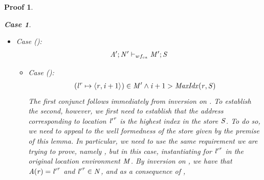 \documentclass[showabstract,showacknowledgments,showpreface,showdedication]{iuphd}
\newtheorem*{bcase}{Case}
\theoremstyle{nonumberplain}
\newtheorem{nproof}{Proof}
\begin{document}
\begin{nproof}
\begin{bcase}
\begin{itemize}
\begin{itemize}
\begin{align*}
      \end{align*}
      Of the requirements for this judgement, the only one that is
      not satisfied immediately by the well formedness of the store
      given in the premise of the lemma is requirement
      The specific requirement is to establish that
      \begin{align*}
      (\locreg{\loc'}{\reg} \mapsto \concreteloc{\reg}{\ind}{})  \in \MENV' \wedge \\
      (\locreg{\loc}{\reg} \mapsto \concreteloc{\reg}{\ind + 1}{})  \in \MENV',
      \end{align*}
      which follows immediately by inversion on \dletloctag{}.
      \item Case ():
      \begin{align*}
      \mathit{A}';\mathit{N}' \vdash_{wf_{ca}} \mathit{M}';\mathit{S}
      \end{align*}
        \begin{itemize}
        \item Case ():
        \begin{align*}
                  ({\mathit{l}}^{\mathit{r}} \mapsto \langle \mathit{r}, \mathit{i}+1 \rangle ^{}) \in \mathit{M}' \wedge
          \mathit{i}+1 > \mathit{MaxIdx}(\mathit{r},\mathit{S})
        \end{align*}
        The first conjunct follows immediately from inversion on \dletloctag{}.
        To establish the second, however, we first need to establish
        that the address corresponding to location ${\mathit{l}'}^{\mathit{r}}$ is the highest index in
        the store $\mathit{S}$.
        To do so, we need to appeal to the well formedness of the store given by the
        premise of this lemma.
        In particular, we need to use the same requirement we are trying to prove,
        namely , but in this case,
        instantiating for ${\mathit{l}'}^{\mathit{r}}$ in the original location environment $\mathit{M}$.
        By inversion on \tlltag{}, we have that $\mathit{A}(\mathit{r}) = {\mathit{l}'}^{\mathit{r}}$ and ${\mathit{l}'}^{\mathit{r}} \in \mathit{N}$,
        and as a consequence of ,
        \begin{align*}

\end{align*}
\end{itemize}
\end{itemize}
\end{itemize}
\end{bcase}
\end{nproof}
\end{document}
